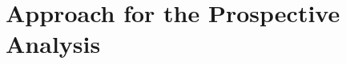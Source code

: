 \documentclass[12pt]{article}
\begin{document}
				
%	
%		
%		
		



\section{Approach for the Prospective Analysis}\label{section_simulations}
\end{document}
